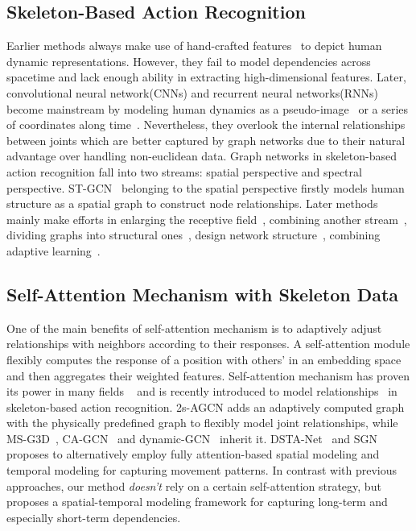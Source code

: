 \documentclass[runningheads]{llncs}
\begin{document}
\subsection{Skeleton-Based Action Recognition}
Earlier methods always make use of hand-crafted features~\cite{vemulapalli2014human,wang2012mining} to depict human dynamic representations. However, they fail to model dependencies across spacetime and lack enough ability in extracting high-dimensional features. Later, convolutional neural network(CNNs) and recurrent neural networks(RNNs) become mainstream by modeling human dynamics as a pseudo-image~\cite{ke2017new,li2017skeleton,li2018co} or a series of coordinates along time~\cite{du2015hierarchical,liu2016spatio,li2018independently,zhang2017view,si2019attention}. Nevertheless, they overlook the internal relationships between joints which are better captured by graph networks due to their natural advantage over handling non-euclidean data. Graph networks in skeleton-based action recognition fall into two streams: spatial perspective and spectral perspective. ST-GCN~\cite{yan2018spatial} belonging to the spatial perspective firstly models human structure as a spatial graph to construct node relationships. Later methods mainly make efforts in enlarging the receptive field~\cite{gao2019optimized,li2019actional,shi2019two,chen2021multi}, combining another stream~\cite{shi2019two,li2019actional,liu2020disentangling,shi2019skeleton}, dividing graphs into structural ones~\cite{li2019actional,thakkar2018part}, design network structure~\cite{huang2020spatio,peng2020learning,song2020stronger,chengdecoupling,chen2021multi}, combining adaptive learning~\cite{shi2019two,ye2020dynamic,shi2019skeleton,zhang2020semantics,hu2020dual,shi2020decoupled,bai2021gcst}.
  
\subsection{Self-Attention Mechanism with Skeleton Data}
One of the main benefits of self-attention mechanism is to adaptively adjust relationships with neighbors according to their responses. A self-attention module flexibly computes the response of a position with others' in an embedding space and then aggregates their weighted features. Self-attention mechanism has proven its power in many fields ~\cite{cheng2016long,lin2017structured,wang2018non,velivckovic2017graph} and is recently introduced to model relationships~\cite{ye2020dynamic,shi2019skeleton,shi2019two,liu2020disentangling,zhang2020semantics,shi2020decoupled} in skeleton-based action recognition. 2s-AGCN adds an adaptively computed graph with the physically predefined graph to flexibly model joint relationships, while MS-G3D~\cite{liu2020disentangling}, CA-GCN~\cite{zhang2020context} and dynamic-GCN~\cite{ye2020dynamic} inherit it. DSTA-Net~\cite{shi2020decoupled} and SGN~\cite{zhang2020semantics} proposes to alternatively employ fully attention-based spatial modeling and temporal modeling for capturing movement patterns. In contrast with previous approaches, our method \textit{doesn't} rely on a certain self-attention strategy, but proposes a spatial-temporal modeling framework for capturing long-term and especially short-term dependencies.
  
\end{document}
